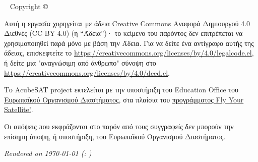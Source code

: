 \documentclass[a4paper,nobib]{tufte-book}
\begin{document}
\makeatother
\maketitle

\newpage
\begin{fullwidth}
~\vfill
\thispagestyle{empty}
\setlength{\parindent}{0pt}
\setlength{\parskip}{\baselineskip}
Copyright \copyright\ \the\year\ \thanklessauthor

\par{}

\par{}

\justify

\par Αυτή η εργασία χορηγείται με άδεια Creative Commons Αναφορά Δημιουργού 4.0 Διεθνές (CC BY 4.0) (η ``Άδεια'')· το κείμενο του παρόντος δεν επιτρέπεται να χρησιμοποιηθεί παρά μόνο με βάση την Άδεια. Για να δείτε ένα αντίγραφο αυτής της άδειας, επισκεφτείτε το
\url{https://creativecommons.org/licenses/by/4.0/legalcode.el}, ή δείτε μια "αναγνώσιμη από άνθρωπο" σύνοψη στο \url{https://creativecommons.org/licenses/by/4.0/deed.el}.

\par Το AcubeSAT project εκτελείται με την υποστήριξη του Education Office του \href{https://www.esa.int/}{Ευρωπαϊκού Οργανισμού Διαστήματος}, στα πλαίσια του \href{https://www.esa.int/Education/CubeSats_-_Fly_Your_Satellite/}{προγράμματος Fly Your Satellite!}.

\par Οι απόψεις που εκφράζονται στο παρόν από τους συγγραφείς δεν μπορούν  την επίσημη άποψη, ή υποστήριξη, του Ευρωπαϊκού Οργανισμού Διαστήματος.

\par\textit{Rendered on \today{} (\texttt{\gitcommit}: \gitcommitmessage)}
\end{fullwidth}

\tableofcontents

\begin{fullwidth}
\listoffigures

\listoftables

\bgroup
\setlength\parskip{1ex}
\printacronyms[pages={display=all,seq/use=false},]
\egroup

\end{fullwidth}
\end{document}

